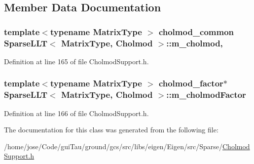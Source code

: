 \subsection{Member Data Documentation}
\hypertarget{class_sparse_l_l_t_3_01_matrix_type_00_01_cholmod_01_4_a900bfc2a39bd5864c3cbae1076329943}{
\subsubsection[{m\-\_\-cholmod}]{\setlength{\rightskip}{0pt plus 5cm}template$<$typename Matrix\-Type $>$ cholmod\-\_\-common {\bf Sparse\-L\-L\-T}$<$ Matrix\-Type, {\bf Cholmod} $>$\-::m\-\_\-cholmod\hspace{0.3cm}{\ttfamily [mutable]}, {\ttfamily [protected]}}}\label{class_sparse_l_l_t_3_01_matrix_type_00_01_cholmod_01_4_a900bfc2a39bd5864c3cbae1076329943}


Definition at line 165 of file Cholmod\-Support.\-h.

\hypertarget{class_sparse_l_l_t_3_01_matrix_type_00_01_cholmod_01_4_ae0a136dd8db31629dd109bad15657c2a}{
\subsubsection[{m\-\_\-cholmod\-Factor}]{\setlength{\rightskip}{0pt plus 5cm}template$<$typename Matrix\-Type $>$ cholmod\-\_\-factor$\ast$ {\bf Sparse\-L\-L\-T}$<$ Matrix\-Type, {\bf Cholmod} $>$\-::m\-\_\-cholmod\-Factor\hspace{0.3cm}{\ttfamily [protected]}}}\label{class_sparse_l_l_t_3_01_matrix_type_00_01_cholmod_01_4_ae0a136dd8db31629dd109bad15657c2a}


Definition at line 166 of file Cholmod\-Support.\-h.



The documentation for this class was generated from the following file\-:\begin{DoxyCompactItemize}
\item 
/home/jose/\-Code/gui\-Tau/ground/gcs/src/libs/eigen/\-Eigen/src/\-Sparse/\hyperlink{_cholmod_support_8h}{Cholmod\-Support.\-h}\end{DoxyCompactItemize}
